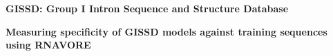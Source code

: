 \documentclass[landscape]{slides}
\begin{document}
\begin{slide}
\begin{center}
\small
\textbf{GISSD: Group I Intron Sequence and Structure Database}
\end{center}



\vfill
\end{slide}
\begin{slide}
\begin{center}
\small
\textbf{Measuring specificity of GISSD models against training
  sequences using RNAVORE} 
\end{center}
\vfill
\end{slide}
\end{document}
